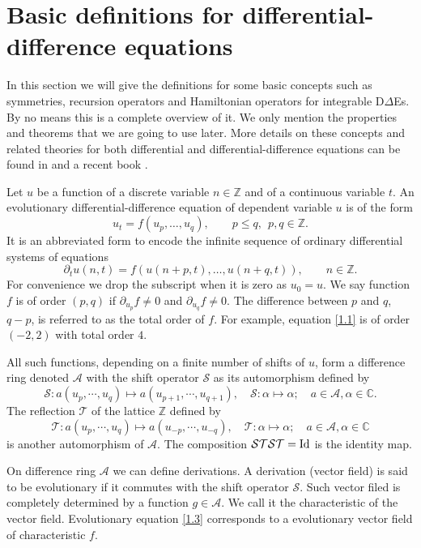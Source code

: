\documentclass{article}
\numberwithin{equation}{section}
\newcommand\cS{{\mathcal S}}
\newcommand\cA{{\mathcal A}}
\newcommand\cT{{\mathcal T}}
\newcommand{\field}[1]{\mathbb{#1}}
\newcommand{\C}{\field{C}}
\newcommand{\Z}{\field{Z}}
\begin{document}
\section{Basic definitions for differential-difference equations}\label{Sec1}
	In this section we will give the definitions for some basic
concepts such as symmetries, recursion operators and Hamiltonian operators for integrable D$\Delta$Es.
By no means this is a complete overview of it. We only
mention the properties and theorems that we are going to use later.
More details on these concepts and related theories for both differential and differential-difference equations
can be found in \cite{52, 19} and a recent book \cite{b12}.

Let $u$ be  a function of a discrete variable $n \in
\mathbb{Z}$ and of a continuous variable $t$.
An evolutionary differential-difference
equation of dependent variable $u$ is of the form
	\begin{equation}
		u_t = f(u_p,\ldots,u_q),\qquad p\le q,\ \ p,q\in\mathbb{Z}.
		\label{1.3}
	\end{equation}
It is an abbreviated form to encode the infinite
sequence of ordinary differential systems of equations
\begin{equation*}
 \partial _t u(n,t)=f(u(n+p,t),\ldots,u(n+q,t)),\qquad
n\in\mathbb{Z}.
\end{equation*}
For convenience we drop the subscript when it is zero as $u_0 = u$.
We say function $f$ is of order $(p, q)$ if $\partial_{u_p} f\neq 0$ and $\partial_{u_q} f\neq 0$.
The difference between $p$ and $q$, $q-p$, is referred to as the total order of $f$. For example, equation \eqref{1.1} is of order $(-2, 2)$
with total order $4$.

All such functions, depending on a finite number of shifts of $u$, form a difference ring denoted $\mathcal{A}$ with the shift operator $\cS$ as its
automorphism defined by
$$
\cS:a(u_p, \cdots, u_q)\mapsto a(u_{p+1}, \cdots, u_{q+1}),\quad \cS:\alpha\mapsto \alpha; \quad a\in \cA,  \alpha\in \C.
$$
The reflection $\cT$ of the lattice $\Z$
defined by
\begin{equation}\label{autoT}
\cT:a(u_p, \cdots, u_q)\mapsto a(u_{-p}, \cdots, u_{-q}),\quad \cT:\alpha\mapsto \alpha; \quad a\in \cA,  \alpha\in \C
\end{equation}
is another automorphism of $\cA$. The composition $\cS\cT\cS\cT= {\rm Id}$ is the identity map.

On difference ring $\mathcal{A}$ we can define derivations. A derivation (vector field) is said to be evolutionary if it commutes with the shift operator
$\cS$. Such vector filed is completely determined by a function $g \in \mathcal{A}$. We call it the
characteristic of the vector field. Evolutionary equation \eqref{1.3} corresponds to a evolutionary vector field of characteristic $f$.
\end{document}
